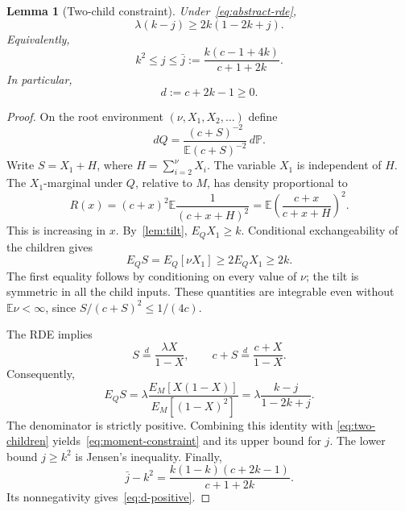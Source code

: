 \documentclass[11pt,a4paper]{article}
\numberwithin{equation}{section}
\theoremstyle{plain}
\newtheorem{lemma}[lemma]{Lemma}
\theoremstyle{definition}
\theoremstyle{remark}
\newcommand{\E}{\mathbb E}
\newcommand{\Prob}{\mathbb P}
\begin{document}
\begin{lemma}[Two-child constraint]\label{lem:two-child}
Under~\eqref{eq:abstract-rde},
\begin{equation}\label{eq:moment-constraint}
 \lambda(k-j)\ge2k(1-2k+j).
\end{equation}
Equivalently,
\begin{equation}\label{eq:j-upper}
 k^2\le j\le\bar j:=\frac{k(c-1+4k)}{c+1+2k}.
\end{equation}
In particular,
\begin{equation}\label{eq:d-positive}
 d:=c+2k-1\ge0.
\end{equation}
\end{lemma}
\begin{proof}
On the root environment $(\nu,X_1,X_2,\ldots)$ define
\begin{equation}\label{eq:Q-root}
 dQ=\frac{(c+S)^{-2}}{\E(c+S)^{-2}}\,d\Prob.
\end{equation}
Write $S=X_1+H$, where $H=\sum_{i=2}^{\nu}X_i$.  The variable $X_1$ is
independent of $H$.  The $X_1$-marginal under $Q$, relative to $M$, has
density proportional to
\begin{equation}\label{eq:R-tilt}
 R(x)=(c+x)^2\E\frac1{(c+x+H)^2}
     =\E\left(\frac{c+x}{c+x+H}\right)^2.
\end{equation}
This is increasing in $x$.  By~\cref{lem:tilt}, $E_QX_1\ge k$.
Conditional exchangeability of the children gives
\begin{equation}\label{eq:two-children}
 E_QS=E_Q[\nu X_1]\ge2E_QX_1\ge2k.
\end{equation}
The first equality follows by conditioning on every value of $\nu$;
the tilt is symmetric in all the child inputs.  These quantities are
integrable even without $\E\nu<\infty$, since
$S/(c+S)^2\le1/(4c)$.

The RDE implies
\begin{equation}
 S\overset d=\frac{\lambda X}{1-X},\qquad
 c+S\overset d=\frac{c+X}{1-X}.
\end{equation}
Consequently,
\begin{equation}\label{eq:EQ-ratio}
 E_QS
 =\lambda\frac{E_M[X(1-X)]}{E_M[(1-X)^2]}
 =\lambda\frac{k-j}{1-2k+j}.
\end{equation}
The denominator is strictly positive.  Combining this identity with
\eqref{eq:two-children} yields~\eqref{eq:moment-constraint} and its upper
bound for $j$.  The lower bound $j\ge k^2$ is Jensen's inequality.
Finally,
\begin{equation}\label{eq:jgap}
 \bar j-k^2
 =\frac{k(1-k)(c+2k-1)}{c+1+2k}.
\end{equation}
Its nonnegativity gives~\eqref{eq:d-positive}.
\end{proof}
\end{document}
